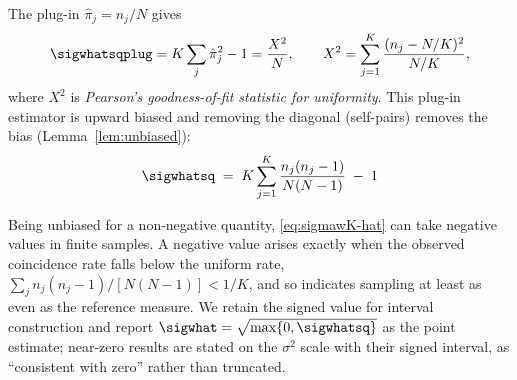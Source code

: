 The plug-in $\hat\pi_j=n_j/N$ gives
\[
  \sigwhatsqplug
  =K\sum_j\hat\pi_j^2-1=\frac{X^2}{N},
  \qquad X^2=\sum_{j=1}^{K}\frac{(n_j-N/K)^2}{N/K},
\]
where $X^2$ is \emph{Pearson's goodness-of-fit statistic for
uniformity}.
This plug-in estimator is upward biased and removing the diagonal (self-pairs) removes the bias (Lemma~\ref{lem:unbiased}):
\begin{equation}
  \sigwhatsq
  \;=\;K\sum_{j=1}^{K}\frac{n_j(n_j-1)}{N(N-1)}\;-\;1
  \label{eq:sigmawK-hat}
\end{equation}

\begin{remark}
\label{rem:negative}
Being unbiased for a non-negative quantity,
\eqref{eq:sigmawK-hat} can take negative values in finite samples.
A negative value arises exactly when the observed coincidence rate falls below the uniform rate, $\sum_j n_j(n_j-1)/[N(N-1)]<1/K$, and so indicates sampling at least as
even as the reference measure.
We retain the signed value for interval construction and report
$\sigwhat=\sqrt{\max\{0,\sigwhatsq\}}$
as the point estimate; near-zero results are stated on the $\sigma^2$
scale with their signed interval, as ``consistent with zero'' rather than
truncated.
\end{remark}

